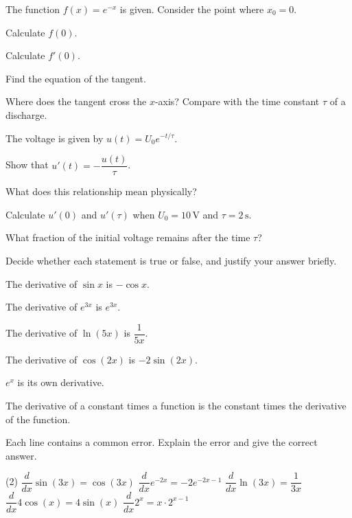 The function $f(x) = e^{-x}$ is given. Consider the point where $x_0 = 0$.
\begin{parts}
  \item Calculate $f(0)$.
  \item Calculate $f'(0)$.
  \item Find the equation of the tangent.
  \item Where does the tangent cross the $x$-axis? Compare with the time constant $\tau$ of a
    discharge.
\end{parts}

The voltage is given by $u(t) = U_0e^{-t/\tau}$.
\begin{parts}
  \item Show that $u'(t) = -\dfrac{u(t)}{\tau}$.
  \item What does this relationship mean physically?
  \item Calculate $u'(0)$ and $u'(\tau)$ when $U_0 = 10\,\text{V}$ and $\tau = 2\,\text{s}$.
  \item What fraction of the initial voltage remains after the time $\tau$?
\end{parts}

Decide whether each statement is true or false, and justify your answer briefly.
\begin{parts}
  \item The derivative of $\sin x$ is $-\cos x$.
  \item The derivative of $e^{3x}$ is $e^{3x}$.
  \item The derivative of $\ln(5x)$ is $\dfrac{1}{5x}$.
  \item The derivative of $\cos(2x)$ is $-2\sin(2x)$.
  \item $e^x$ is its own derivative.
  \item The derivative of a constant times a function is the constant times the derivative of the
    function.
\end{parts}

Each line contains a common error. Explain the error and give the correct answer.
\begin{delar}(2)
  \task $\dfrac{d}{dx}\sin(3x) = \cos(3x)$
  \task $\dfrac{d}{dx}e^{-2x} = -2e^{-2x-1}$
  \task $\dfrac{d}{dx}\ln(3x) = \dfrac{1}{3x}$
  \task $\dfrac{d}{dx}4\cos(x) = 4\sin(x)$
  \task $\dfrac{d}{dx}2^x = x \cdot 2^{x-1}$
\end{delar}

